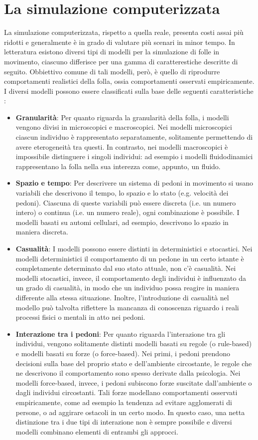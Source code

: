 \documentclass[12pt,a4paper,openright,oneside]{book}
\begin{document}
\section{La simulazione computerizzata}
La simulazione computerizzata, rispetto a quella reale, presenta costi assai più ridotti e generalmente è in grado di valutare più scenari in minor tempo. In letteratura esistono diversi tipi di modelli per la simulazione di folle in movimento, ciascuno differisce per una gamma di caratterestiche descritte di seguito. Obbiettivo comune di tali modelli, però, è quello di riprodurre comportamenti realistici della folla, ossia comportamenti osservati empiricamente. I diversi modelli possono essere classificati sulla base delle seguenti caratteristiche \cite{SchadschneiderEvacuationDynamics2009}:
\begin{itemize}
 \item \textbf{Granularità}: Per quanto riguarda la granularità della folla, i modelli vengono divisi in microscopici e macroscopici. Nei modelli microscopici ciascun individuo è rappresentato separatamente, solitamente permettendo di avere eterogeneità tra questi. In contrasto, nei modelli macroscopici è impossibile distinguere i singoli individui: ad esempio i modelli fluidodinamici rappresentano la folla nella sua interezza come, appunto, un fluido.
 \item \textbf{Spazio e tempo}: Per descrivere un sistema di pedoni in movimento si usano variabili che descrivono il tempo, lo spazio e lo stato (e.g. velocità dei pedoni). Ciascuna di queste variabili può essere discreta (i.e. un numero intero) o continua (i.e. un numero reale), ogni combinazione è possibile. I modelli basati su automi cellulari, ad esempio, descrivono lo spazio in maniera discreta.
 \item \textbf{Casualità}: I modelli possono essere distinti in deterministici e stocastici. Nei modelli deterministici il comportamento di un pedone in un certo istante è completamente determinato dal suo stato attuale, non c'è casualità. Nei modelli stocastici, invece, il comportamento degli individui è influenzato da un grado di casualità, in modo che un individuo possa reagire in maniera differente alla stessa situazione. Inoltre, l'introduzione di casualità nel modello può talvolta riflettere la mancanza di conoscenza riguardo i reali processi fisici o mentali in atto nei pedoni.
 \item \textbf{Interazione tra i pedoni}: Per quanto riguarda l'interazione tra gli individui, vengono solitamente distinti modelli basati su regole (o rule-based) e modelli basati su forze (o force-based). Nei primi, i pedoni prendono decisioni sulla base del proprio stato e dell'ambiente circostante, le regole che ne descrivono il comportamento sono spesso derivate dalla psicologia. Nei modelli force-based, invece, i pedoni subiscono forze suscitate dall'ambiente o dagli individui circostanti. Tali forze modellano comportamenti osservati empiricamente, come ad esempio la tendenza ad evitare agglomerati di persone, o ad aggirare ostacoli in un certo modo. 
 In questo caso, una netta distinzione tra i due tipi di interazione non è sempre possibile e diversi modelli combinano elementi di entrambi gli approcci.
\end{itemize}
\end{document}
